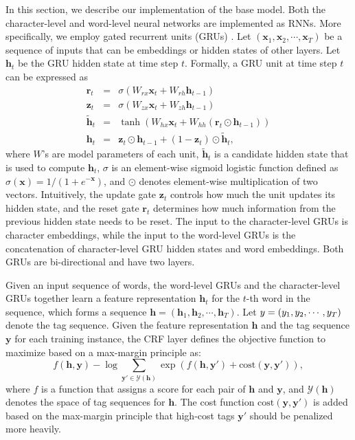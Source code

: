In this section, we describe our implementation of the base model. Both the character-level and word-level neural networks are implemented as RNNs. More specifically, we employ gated recurrent units (GRUs) \citep{cho2014properties}. Let $(\mathbf{x}_1, \mathbf{x}_2, \cdots, \mathbf{x}_T)$ be a sequence of inputs that can be embeddings or hidden states of other layers. Let $\mathbf{h}_t$ be the GRU hidden state at time step $t$. Formally, a GRU unit at time step $t$ can be expressed as
\begin{eqnarray*}
\mathbf{r}_t &=& \sigma(W_{rx} \mathbf{x}_t + W_{rh} \mathbf{h}_{t - 1}) \\
\mathbf{z}_t &=& \sigma(W_{zx} \mathbf{x}_t + W_{zh} \mathbf{h}_{t - 1}) \\
\tilde{\mathbf{h}}_t &=& \tanh(W_{hx} \mathbf{x}_t + W_{hh} (\mathbf{r}_t \odot \mathbf{h}_{t - 1})) \\
\mathbf{h}_t &=& \mathbf{z}_t \odot \mathbf{h}_{t- 1} + (1 - \mathbf{z}_t) \odot \tilde{\mathbf{h}}_t,
\end{eqnarray*}
where $W$'s are model parameters of each unit, $\tilde{\mathbf{h}}_t$ is a candidate hidden state that is used to compute $\mathbf{h}_t$, $\sigma$ is an element-wise sigmoid logistic function defined as $\sigma(\mathbf{x}) = 1 / (1 + e^{- \mathbf{x}})$, and $\odot$ denotes element-wise multiplication of two vectors. Intuitively, the update gate $\mathbf{z}_t$ controls how much the unit updates its hidden state, and the reset gate $\mathbf{r}_t$ determines how much information from the previous hidden state needs to be reset. The input to the character-level GRUs is character embeddings, while the input to the word-level GRUs is the concatenation of character-level GRU hidden states and word embeddings. Both GRUs are bi-directional and have two layers.

Given an input sequence of words, the word-level GRUs and the character-level GRUs together learn a feature representation $\mathbf{h}_t$ for the $t$-th word in the sequence, which forms a sequence $\mathbf{h} = (\mathbf{h}_1, \mathbf{h}_2, \cdots, \mathbf{h}_T)$. Let $\mathbf\mathbf{y} = (y_1, y_2, \cdots, y_T)$ denote the tag sequence. Given the feature representation $\mathbf{h}$ and the tag sequence $\mathbf{y}$ for each training instance, the CRF layer defines the objective function to maximize based on a max-margin principle \citep{gimpel2010softmax} as:
\[
f(\mathbf{h}, \mathbf{y}) - \log \sum_{\mathbf{y}' \in \mathcal{Y}(\mathbf{h})} \exp (f(\mathbf{h}, \mathbf{y}') + \mbox{cost} (\mathbf{y}, \mathbf{y}')),
\]
where $f$ is a function that assigns a score for each pair of $\mathbf{h}$ and $\mathbf{y}$, and $\mathcal{Y}(\mathbf{h})$ denotes the space of tag sequences for $\mathbf{h}$. The cost function $\mbox{cost}(\mathbf{y}, \mathbf{y}')$ is added based on the max-margin principle \citep{gimpel2010softmax} that high-cost tags $\mathbf{y}'$ should be penalized more heavily.

